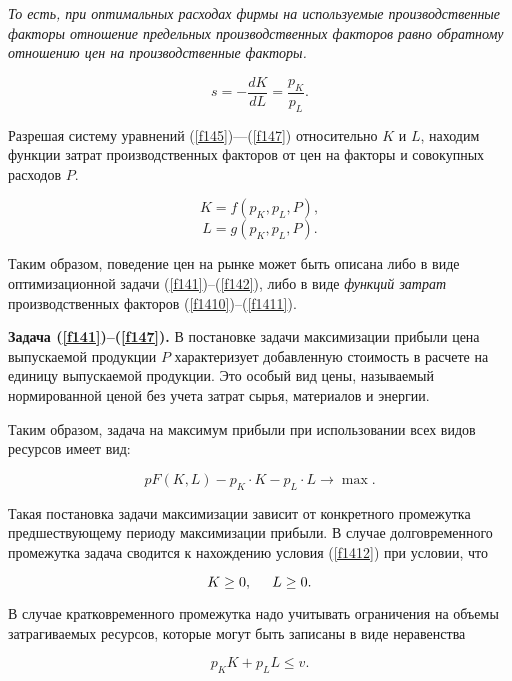 \documentclass[12pt,openbib]{report}
\begin{document}
{\it То есть, при оптимальных расходах фирмы на используемые
производственные факторы отношение предельных производственных
факторов равно обратному отношению цен на производственные факторы.}

\begin{equation}\label{f149}
s=-\frac{dK}{dL}=\frac{p_K}{p_L}.
\end{equation}

Разрешая систему уравнений (\ref{f145})---(\ref{f147}) относительно $K$ и $L$,
находим функции затрат производственных факторов от цен на факторы и
совокупных расходов $P$.

\begin{equation}\label{f1410}
K=f(p_K,p_L,P),
\end{equation}
\begin{equation}\label{f1411}
L=g(p_K,p_L,P).
\end{equation}

Таким образом, поведение цен на рынке может быть описана либо в виде
оптимизационной задачи (\ref{f141})--(\ref{f142}), либо в виде {\it функций
затрат} производственных факторов (\ref{f1410})--(\ref{f1411}).

{\bf Задача (\ref{f141})--(\ref{f147}).} В постановке задачи максимизации
прибыли цена выпускаемой продукции $P$ характеризует добавленную
стоимость в расчете на единицу выпускаемой продукции. Это особый вид
цены, называемый нормированной ценой без учета затрат сырья,
материалов и энергии.

Таким образом, задача на максимум прибыли при использовании всех
видов ресурсов имеет вид:

\begin{equation}\label{f1412}
pF(K,L)-p_K\cdot K-p_L\cdot L\to \max.
\end{equation}

Такая постановка задачи максимизации зависит от конкретного
промежутка предшествующему периоду максимизации прибыли. В случае
долговременного промежутка задача сводится к нахождению условия
(\ref{f1412}) при условии, что

\begin{equation}\label{f1413}
K\ge0,\hspace{5mm}L\ge0.
\end{equation}

В случае кратковременного промежутка надо учитывать ограничения на
объемы затрагиваемых ресурсов, которые могут быть записаны в виде
неравенства

\begin{equation}\label{f1414}
p_KK+p_LL\le v.
\end{equation}
\end{document}
